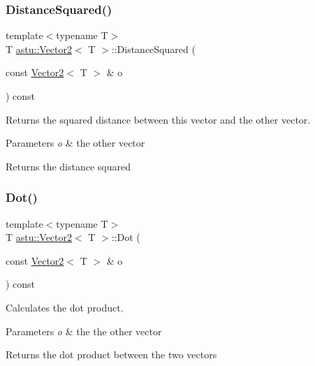 \subsubsection{\texorpdfstring{Distance\+Squared()}{DistanceSquared()}}
{\footnotesize\ttfamily template$<$typename T$>$ \\
T \hyperlink{classastu_1_1Vector2}{astu\+::\+Vector2}$<$ T $>$\+::Distance\+Squared (\begin{DoxyParamCaption}\item[{const \hyperlink{classastu_1_1Vector2}{Vector2}$<$ T $>$ \&}]{o }\end{DoxyParamCaption}) const\hspace{0.3cm}{\ttfamily [inline]}}

Returns the squared distance between this vector and the other vector.


\begin{DoxyParams}{Parameters}
{\em o} & the other vector \\
\hline
\end{DoxyParams}
\begin{DoxyReturn}{Returns}
the distance squared 
\end{DoxyReturn}
\mbox{\label{classastu_1_1Vector2_a44f449c9f23b8e5aa2739c3a50b57ceb}} 
\subsubsection{\texorpdfstring{Dot()}{Dot()}\hspace{0.1cm}{\footnotesize\ttfamily [1/2]}}
{\footnotesize\ttfamily template$<$typename T$>$ \\
T \hyperlink{classastu_1_1Vector2}{astu\+::\+Vector2}$<$ T $>$\+::Dot (\begin{DoxyParamCaption}\item[{const \hyperlink{classastu_1_1Vector2}{Vector2}$<$ T $>$ \&}]{o }\end{DoxyParamCaption}) const\hspace{0.3cm}{\ttfamily [inline]}}

Calculates the dot product.


\begin{DoxyParams}{Parameters}
{\em o} & the the other vector \\
\hline
\end{DoxyParams}
\begin{DoxyReturn}{Returns}
the dot product between the two vectors 
\end{DoxyReturn}
\mbox{\label{classastu_1_1Vector2_a0fb863e03982e1583a0945873caf92d7}} 
